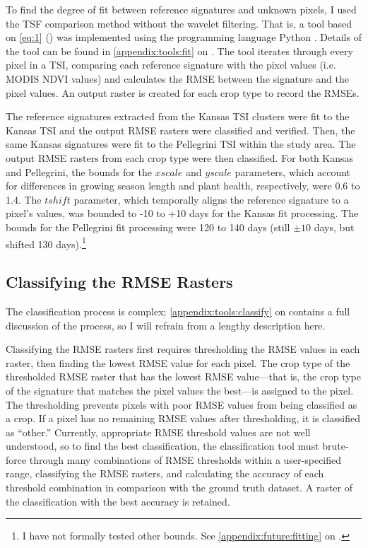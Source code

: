 To find the degree of fit between reference signatures and unknown pixels, I used the TSF comparison method without the wavelet filtering. That is, a tool based on \autoref{eq:1} () was implemented using the programming language Python \autocite{python2.7.8}. Details of the tool can be found in \autoref{appendix:tools:fit} on . The tool iterates through every pixel in a TSI, comparing each reference signature with the pixel values (i.e. MODIS NDVI values) and calculates the RMSE between the signature and the pixel values. An output raster is created for each crop type to record the RMSEs.

The reference signatures extracted from the Kansas TSI clusters were fit to the Kansas TSI and the output RMSE rasters were classified and verified. Then, the same Kansas signatures were fit to the Pellegrini TSI within the study area. The output RMSE rasters from each crop type were then classified. For both Kansas and Pellegrini, the bounds for the $xscale$ and $yscale$ parameters, which account for differences in growing season length and plant health, respectively, were 0.6 to 1.4. The $tshift$ parameter, which temporally aligns the reference signature to a pixel's values, was bounded to -10 to +10 days for the Kansas fit processing. The bounds for the Pellegrini fit processing were 120 to 140 days (still $\pm10$ days, but shifted 130 days).\footnote{I have not formally tested other bounds. See \autoref{appendix:future:fitting} on .} 


\subsection{Classifying the RMSE Rasters}

The classification process is complex; \autoref{appendix:tools:classify} on  contains a full discussion of the process, so I will refrain from a lengthy description here.

Classifying the RMSE rasters first requires thresholding the RMSE values in each raster, then finding the lowest RMSE value for each pixel. The crop type of the thresholded RMSE raster that has the lowest RMSE value---that is, the crop type of the signature that matches the pixel values the best---is assigned to the pixel. The thresholding prevents pixels with poor RMSE values from being classified as a crop. If a pixel has no remaining RMSE values after thresholding, it is classified as ``other.'' Currently, appropriate RMSE threshold values are not well understood, so to find the best classification, the classification tool must brute-force through many combinations of RMSE thresholds within a user-specified range, classifying the RMSE rasters, and calculating the accuracy of each threshold combination in comparison with the ground truth dataset. A raster of the classification with the best accuracy is retained.

